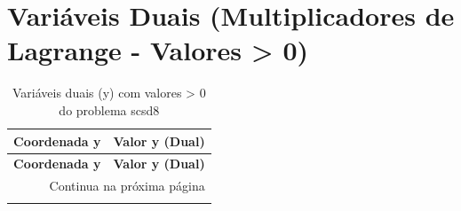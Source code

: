 \documentclass[12pt]{article}
\begin{document}
\section{Variáveis Duais (Multiplicadores de Lagrange - Valores > 0)}

\begin{longtable}{@{}cc@{}}
\caption{Variáveis duais (y) com valores > 0 do problema scsd8} \\
\toprule
\textbf{Coordenada y} & \textbf{Valor y (Dual)} \\
\midrule
\endfirsthead

\toprule
\textbf{Coordenada y} & \textbf{Valor y (Dual)} \\
\midrule
\endhead

\midrule \multicolumn{2}{r}{{Continua na próxima página}} \\ \midrule
\endfoot


\end{longtable}
\end{document}
